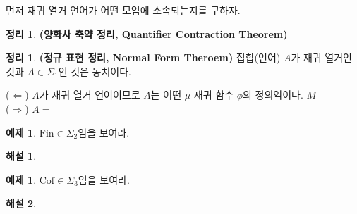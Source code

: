 \documentclass[b5paper, 11pt]{book}
\theoremstyle{definition}
\newtheorem{thm}[defn]{정리}
\newtheorem{ex}[defn]{예제}
\newtheorem*{ans*}{해설}
\newenvironment{pf*}{\pushQED{\qed}\pf}
{\popQED\endpf}
\begin{document}
먼저 재귀 열거 언어가 어떤 모임에 소속되는지를 구하자. 
\begin{thm}
    \textbf{(양화사 축약 정리, Quantifier Contraction Theorem)}
    
\end{thm}
\begin{thm}
    \textbf{(정규 표현 정리, Normal Form Theroem)} 집합(언어) $A$가 재귀 열거인 것과 $A \in \Sigma_1$인 것은 동치이다. 
\end{thm}
\begin{pf*}
    ($\Leftarrow$) $A$가 재귀 열거 언어이므로 $A$는 어떤 $\mu$-재귀 함수 $\phi$의 정의역이다. $M$ \\
    ($\Rightarrow$) $A = $
\end{pf*}
\begin{ex}
    $\mathrm{Fin} \in \Sigma_2$임을 보여라.
\end{ex}
\begin{ans*}
    
\end{ans*}
\begin{ex}
    $\mathrm{Cof} \in \Sigma_3$임을 보여라.
\end{ex}
\begin{ans*}
    
\end{ans*}
\end{document}
